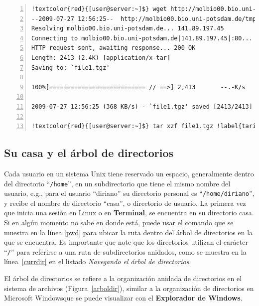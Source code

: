 \documentclass[letter,11pt]{book}
\begin{document}
\begin{Verbatim}[commandchars=!\{\},numbers=left,firstnumber=last,label=Descarga de archivos,frame=topline,fontsize=\scriptsize]
!textcolor{red}{[user@server:~]$} wget http://molbio00.bio.uni-potsdam.de/tmp/file1.tgz !label{wgetini}
--2009-07-27 12:56:25--  http://molbio00.bio.uni-potsdam.de/tmp/file1.tgz !label{wgetinistart}
Resolving molbio00.bio.uni-potsdam.de... 141.89.197.45
Connecting to molbio00.bio.uni-potsdam.de|141.89.197.45|:80... connected.
HTTP request sent, awaiting response... 200 OK
Length: 2413 (2.4K) [application/x-tar]
Saving to: `file1.tgz'

100%[=========================== // ==>] 2,413       --.-K/s   in 0.006s

2009-07-27 12:56:25 (368 KB/s) - `file1.tgz' saved [2413/2413] !label{wgetinistop}

!textcolor{red}{[user@server:~]$} tar xzf file1.tgz !label{tarini}
\end{Verbatim} 

\subsection{Su casa y el árbol de directorios\label{casadir}}

Cada usuario en un sistema Unix tiene reservado un espacio, generalmente dentro del directorio ``\Verb+/home+'', en un subdirectorio que tiene el mismo nombre del usuario, e.g., para el usuario ``diriano'' su directorio personal es ``\Verb+/home/diriano+'', y recibe el nombre de directorio ``casa'', o directorio de usuario.  La primera vez que inicia una sesión en Linux o en \textbf{Terminal}, se encuentra en su directorio casa. Si en algún momento no sabe en donde está, puede usar el comando que se muestra en la línea \ref{pwd} para ubicar la ruta dentro del árbol de directorios en la que se encuentra. Es importante que note que los directorios utilizan el carácter ``\Verb+/+'' para referirse a una ruta de subdirectorios anidados, como se muestra en la línea~\ref{currdir} en el listado \textit{Navegando el árbol de directorios}.

El árbol de directorios se refiere a la organización anidada de directorios en el sistema de archivos (Figura~\ref{arboldir}), similar a la organización de directorios en Microsoft Windows\texttrademark que se puede visualizar con el \textbf{Explorador de Windows}.
\end{document}
